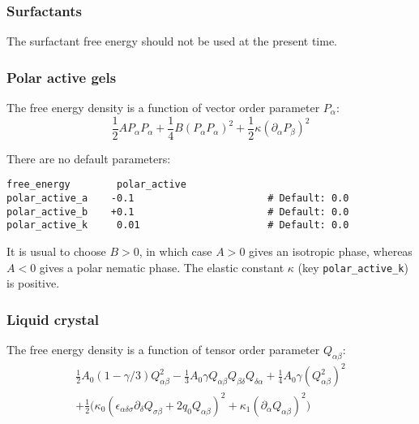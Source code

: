 \subsubsection{Surfactants}
\label{input-surfactants}

The surfactant free energy should not be used at the present time.

\subsubsection{Polar active gels}
\label{input-polar-active-gels}

The free energy density is a function of vector order parameter $P_\alpha$:
\[
{\textstyle \frac{1}{2}} A P_\alpha P_\alpha +
{\textstyle \frac{1}{4}} B (P_\alpha P_\alpha)^2 +
{\textstyle \frac{1}{2}} \kappa (\partial_\alpha P_\beta)^2
\]

There are no default parameters:
\begin{lstlisting}
free_energy        polar_active
polar_active_a    -0.1                       # Default: 0.0
polar_active_b    +0.1                       # Default: 0.0
polar_active_k     0.01                      # Default: 0.0
\end{lstlisting}
It is usual to choose $B > 0$, in which case $A > 0$ gives
an isotropic phase, whereas $A < 0$ gives a polar nematic phase.
The elastic constant $\kappa$ (key \texttt{polar\_active\_k})
is positive.

\subsubsection{Liquid crystal}
\label{input-liquid-crystal}
The free energy density is a function of tensor order parameter
$Q_{\alpha\beta}$:
\begin{eqnarray}
{\textstyle\frac{1}{2}} A_0 (1 - \gamma/3)Q^2_{\alpha\beta} -
{\textstyle\frac{1}{3}} A_0 \gamma
                        Q_{\alpha\beta}Q_{\beta\delta}Q_{\delta\alpha} +
{\textstyle\frac{1}{4}} A_0 \gamma (Q^2_{\alpha\beta})^2
\nonumber \\
+ {\textstyle\frac{1}{2}} \Big(
\kappa_0 (\epsilon_{\alpha\delta\sigma} \partial_\delta Q_{\sigma\beta} +
2q_0 Q_{\alpha\beta})^2 + \kappa_1(\partial_\alpha Q_{\alpha\beta})^2 \Big)
\nonumber
\end{eqnarray}

